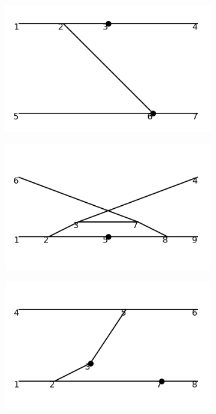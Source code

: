 \documentclass[11pt,a4paper,twoside,pdf]{article}
\numberwithin{equation}{section}
\begin{document}
\begin{figure}[h!]
\begin{subfigure}[t]{0.16\textwidth}
    \end{subfigure}
    \hfill
    \begin{subfigure}[t]{0.16\textwidth}
        \centering
        \includegraphics[width=\textwidth]{plots/order6_2to2/counterterms/16.png}
    \end{subfigure}
    \hfill
    \begin{subfigure}[t]{0.16\textwidth}
        \centering
        \includegraphics[width=\textwidth]{plots/order6_2to2/counterterms/17.png}
    \end{subfigure}
    \hfill  
    \begin{subfigure}[t]{0.16\textwidth}
        \centering
        \includegraphics[width=\textwidth]{plots/order6_2to2/counterterms/18.png}

\end{subfigure}
\end{figure}
\end{document}
